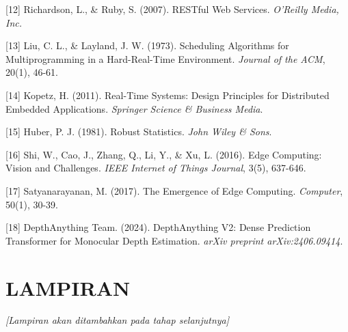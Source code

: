 \documentclass[12pt,a4paper]{report}
\begin{document}
\begin{thebibliography}{99}
[12] Richardson, L., \& Ruby, S. (2007). RESTful Web Services. \textit{O'Reilly Media, Inc.}

[13] Liu, C. L., \& Layland, J. W. (1973). Scheduling Algorithms for Multiprogramming in a Hard-Real-Time Environment. \textit{Journal of the ACM}, 20(1), 46-61.

[14] Kopetz, H. (2011). Real-Time Systems: Design Principles for Distributed Embedded Applications. \textit{Springer Science \& Business Media}.

[15] Huber, P. J. (1981). Robust Statistics. \textit{John Wiley \& Sons}.

[16] Shi, W., Cao, J., Zhang, Q., Li, Y., \& Xu, L. (2016). Edge Computing: Vision and Challenges. \textit{IEEE Internet of Things Journal}, 3(5), 637-646.

[17] Satyanarayanan, M. (2017). The Emergence of Edge Computing. \textit{Computer}, 50(1), 30-39.

[18] DepthAnything Team. (2024). DepthAnything V2: Dense Prediction Transformer for Monocular Depth Estimation. \textit{arXiv preprint arXiv:2406.09414}.

\end{thebibliography}

\chapter*{LAMPIRAN}

\textit{[Lampiran akan ditambahkan pada tahap selanjutnya]}
\end{document}
